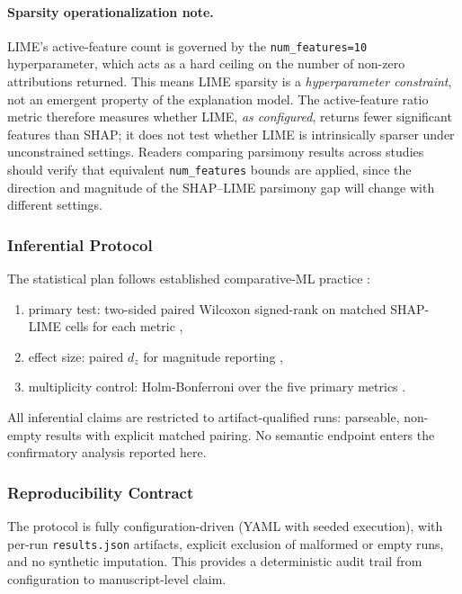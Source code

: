 \documentclass[fleqn,10pt,lineno]{wlpeerj}
\begin{document}
\paragraph{Sparsity operationalization note.}
LIME's active-feature count is governed by the \texttt{num\_features=10} hyperparameter, which acts as a hard ceiling on the number of non-zero attributions returned. This means LIME sparsity is a \emph{hyperparameter constraint}, not an emergent property of the explanation model. The active-feature ratio metric therefore measures whether LIME, \emph{as configured}, returns fewer significant features than SHAP; it does not test whether LIME is intrinsically sparser under unconstrained settings. Readers comparing parsimony results across studies should verify that equivalent \texttt{num\_features} bounds are applied, since the direction and magnitude of the SHAP--LIME parsimony gap will change with different settings.

\subsubsection{Inferential Protocol}
\label{sec:inference}

The statistical plan follows established comparative-ML practice
\citep{demsar2006statistical}:
\begin{enumerate}[leftmargin=*]
\item primary test: two-sided paired Wilcoxon signed-rank on matched
SHAP-LIME cells for each metric \citep{wilcoxon1945individual},
\item effect size: paired $d_z$ for magnitude reporting
\citep{lakens2013calculating},
\item multiplicity control: Holm-Bonferroni over the five primary metrics
\citep{holm1979simple}.
\end{enumerate}

All inferential claims are restricted to artifact-qualified runs:
parseable, non-empty results with explicit matched pairing. No semantic
endpoint enters the confirmatory analysis reported here.

\subsubsection{Reproducibility Contract}
\label{sec:reproducibility}

The protocol is fully configuration-driven (YAML with seeded execution),
with per-run \texttt{results.json} artifacts, explicit exclusion of
malformed or empty runs, and no synthetic imputation. This provides a
deterministic audit trail from configuration to manuscript-level claim.
\end{document}
